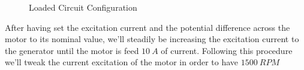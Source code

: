 \documentclass[11pt, openright]{book}
\begin{document}
\begin{figure}[ht]
	
	\caption{Loaded Circuit Configuration}
	
\end{figure}

After having set the excitation current and the potential difference across the motor to its nominal value, we'll steadily be increasing the excitation current to the generator until the motor is feed $10\ A$ of current. Following this procedure we'll tweak the current excitation of the motor in order to have $1500\ RPM$
\newpage
\end{document}
